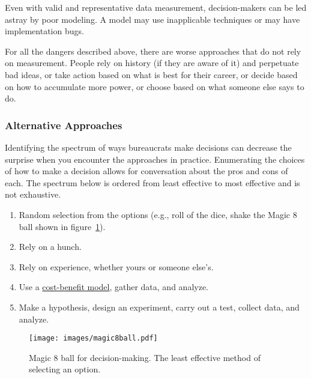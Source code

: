 Even with valid and representative data measurement, decision-makers can be led astray by poor modeling. A model may use inapplicable techniques or may have implementation bugs.

For all the dangers described above,
there are worse approaches that do not rely on measurement. People rely on history (if they are aware of it) and perpetuate bad ideas, or take action based on what is best for their career, or decide based on how to accumulate more power, or choose based on what someone else says to do.  

\subsubsection{Alternative Approaches}
Identifying the spectrum of ways bureaucrats make decisions can decrease the surprise when you encounter the approaches in practice. 
Enumerating the choices of how to make a decision allows for conversation about the pros and cons of each. The spectrum below is ordered from least effective to most effective and is not exhaustive.
\begin{enumerate}
    \item Random selection from the options (e.g., roll of the dice, shake the Magic 8 ball shown in figure~\ref{fig:magic8ball}).
    \item Rely on a hunch.
    \item Rely on experience, whether yours or someone else's.
    \item Use a \href{https://en.wikipedia.org/wiki/Cost\%E2\%80\%93benefit_analysis}{cost-benefit model}, 
    \iftoggle{WPinmargin}{\marginpar{[Wikipedia] cost-\\benefit analysis}}{} gather data, and analyze.
    \item Make a hypothesis, design an experiment, carry out a test, collect data, and analyze.
\end{enumerate}

\begin{figure}
    \centering
    \texttt{[image: images/magic8ball.pdf]}
    \caption{Magic 8 ball for decision-making. The least effective method of selecting an option.}
    \label{fig:magic8ball}
\end{figure}

